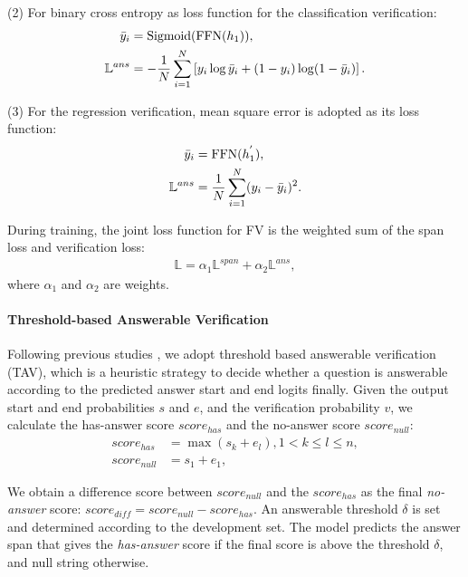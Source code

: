 \documentclass[letterpaper]{article} %
\begin{document}
(2) For binary cross entropy as loss function for the classification verification:
\begin{equation}
\begin{split}
\bar{y}_{i} &= \textup{Sigmoid}(\textup{FFN}(h_1)),\\
\mathbb{L}^{ans} &= -\frac{1}{N}\sum_{i=1}^{N}\left [ y_{i}\log\bar{y}_{i} + (1-y _{i})\log(1-\bar{y}_{i})\right ].
\end{split}
\end{equation}

(3) For the regression verification, %
mean square error is adopted as its loss function:
\begin{align}
\bar{y}_{i} &= \textup{FFN}(h^{'}_{1}),\\
\mathbb{L}^{ans}&= \frac{1}{N}\sum_{i=1}^{N}(y_{i}-\bar{y}_{i})^{2}.
\end{align}


During training, the joint loss function for FV is the weighted sum of the span loss and verification loss:
\begin{align}
\mathbb{L} = \alpha_{1}\mathbb{L}^{span} + \alpha_{2} \mathbb{L}^{ans},
\end{align}
where $\alpha_{1}$ and $\alpha_{2}$ are weights.

\paragraph{Threshold-based Answerable Verification}\label{sec:ap}
Following previous studies \cite{devlin2018bert,yang2019xlnet,liu2019roberta,Lan2020ALBERT}, we adopt threshold based answerable verification (TAV), which is a heuristic strategy to decide whether a question is answerable according to the predicted answer start and end logits finally. Given the output start and end probabilities $s$ and $e$, and the verification probability $v$, we calculate the has-answer score $score_{has}$ and the no-answer score $score_{null}$:
\begin{equation}
\begin{split}
score_{has} & =\max (s_k + e_l),1 < k \le l \le n, \\
score_{null} & = s_1+e_1,
\end{split}
\end{equation}

We obtain a difference score between $score_{null}$ and the $score_{has}$ as the final \textit{no-answer} score: $score_{diff} = score_{null} - score_{has}$. An answerable threshold $\delta$ %
is set and determined %
according to the development set. The model predicts the answer span that gives the \textit{has-answer} score if the final score is above the threshold $\delta$, and null string otherwise.
\end{document}
